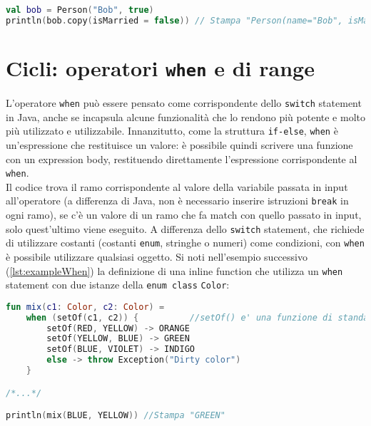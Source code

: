\begin{lstlisting}[caption={Utilizzo della funzione \texttt{copy}}, captionpos=b, label={lst:exampleCopy}, language=Kotlin]
val bob = Person("Bob", true)
println(bob.copy(isMarried = false)) // Stampa "Person(name="Bob", isMarried=false)"
\end{lstlisting}

\section{Cicli: operatori \texttt{when} e di range}
L’operatore \texttt{when} può essere pensato come corrispondente dello \texttt{switch} statement in Java, anche se incapsula alcune funzionalità che lo rendono più potente e molto più utilizzato e utilizzabile. Innanzitutto, come la struttura \texttt{if-else}, \texttt{when} è un'espressione che restituisce un valore: è possibile quindi scrivere una funzione con un expression body, restituendo direttamente l'espressione corrispondente al \texttt{when}.\\
Il codice trova il ramo corrispondente al valore della variabile passata in input all’operatore (a differenza di Java, non è necessario inserire istruzioni \texttt{break} in ogni ramo), se c’è un valore di un ramo che fa match con quello passato in input, solo quest’ultimo viene eseguito. A differenza dello \texttt{switch} statement, che richiede di utilizzare costanti (costanti \texttt{enum}, stringhe o numeri) come condizioni, con \texttt{when} è possibile utilizzare qualsiasi oggetto. Si noti nell'esempio successivo (\ref{lst:exampleWhen}) la definizione di una inline function che utilizza un \texttt{when} statement con due istanze della \texttt{enum class} \texttt{Color}:\\

\begin{lstlisting}[caption={Il costrutto \texttt{when}}, captionpos=b, label={lst:exampleWhen}, language=Kotlin]
fun mix(c1: Color, c2: Color) =
    when (setOf(c1, c2)) {          //setOf() e' una funzione di standard library
        setOf(RED, YELLOW) -> ORANGE
        setOf(YELLOW, BLUE) -> GREEN
        setOf(BLUE, VIOLET) -> INDIGO
        else -> throw Exception("Dirty color")
    }

/*...*/

println(mix(BLUE, YELLOW)) //Stampa "GREEN"
\end{lstlisting}

